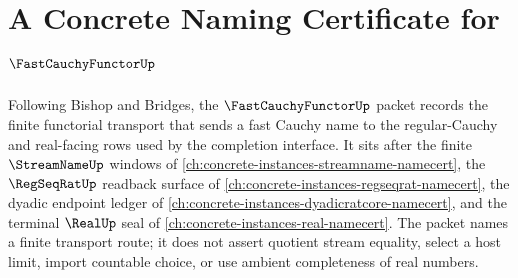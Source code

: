 \chapter{A Concrete Naming Certificate for $\FastCauchyFunctorUp$}
\label{ch:concrete-instances-fast-cauchy-functor-namecert}

Following Bishop and Bridges, the $\FastCauchyFunctorUp$ packet records the finite functorial transport that sends a fast Cauchy name to the regular-Cauchy and real-facing rows used by the completion interface. It sits after the finite $\StreamNameUp$ windows of \autoref{ch:concrete-instances-streamname-namecert}, the $\RegSeqRatUp$ readback surface of \autoref{ch:concrete-instances-regseqrat-namecert}, the dyadic endpoint ledger of \autoref{ch:concrete-instances-dyadicratcore-namecert}, and the terminal $\RealUp$ seal of \autoref{ch:concrete-instances-real-namecert}. The packet names a finite transport route; it does not assert quotient stream equality, select a host limit, import countable choice, or use ambient completeness of real numbers.

